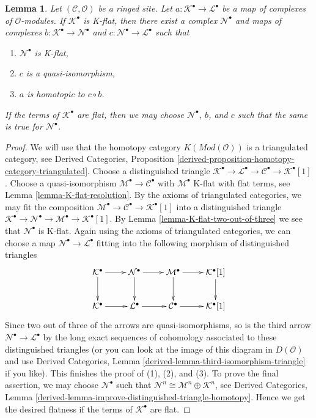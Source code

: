 \documentclass[10pt,a4paper]{amsart}
\theoremstyle{plain}
\newtheorem{lemma}[subsection]{Lemma}
\theoremstyle{definition}
\theoremstyle{remark}
\numberwithin{equation}{subsection}
\begin{document}
\begin{lemma}
\label{lemma-factor-through-K-flat}
Let $(\mathcal{C}, \mathcal{O})$ be a ringed site.
Let $a : \mathcal{K}^\bullet \to \mathcal{L}^\bullet$ be a map of complexes
of $\mathcal{O}$-modules. If $\mathcal{K}^\bullet$ is K-flat, then
there exist a complex $\mathcal{N}^\bullet$ and maps of complexes
$b : \mathcal{K}^\bullet \to \mathcal{N}^\bullet$
and $c : \mathcal{N}^\bullet \to \mathcal{L}^\bullet$ such that
\begin{enumerate}
\item $\mathcal{N}^\bullet$ is K-flat,
\item $c$ is a quasi-isomorphism,
\item $a$ is homotopic to $c \circ b$.
\end{enumerate}
If the terms of $\mathcal{K}^\bullet$ are flat, then we may choose
$\mathcal{N}^\bullet$, $b$, and $c$
such that the same is true for $\mathcal{N}^\bullet$.
\end{lemma}

\begin{proof}
We will use that the homotopy category $K(\textit{Mod}(\mathcal{O}))$
is a triangulated category, see Derived Categories, Proposition
\ref{derived-proposition-homotopy-category-triangulated}.
Choose a distinguished triangle
$\mathcal{K}^\bullet \to \mathcal{L}^\bullet \to
\mathcal{C}^\bullet \to \mathcal{K}^\bullet[1]$.
Choose a quasi-isomorphism $\mathcal{M}^\bullet \to \mathcal{C}^\bullet$ with
$\mathcal{M}^\bullet$ K-flat with flat terms, see
Lemma \ref{lemma-K-flat-resolution}.
By the axioms of triangulated categories,
we may fit the composition
$\mathcal{M}^\bullet \to \mathcal{C}^\bullet \to \mathcal{K}^\bullet[1]$
into a distinguished triangle
$\mathcal{K}^\bullet \to \mathcal{N}^\bullet \to
\mathcal{M}^\bullet \to \mathcal{K}^\bullet[1]$.
By Lemma \ref{lemma-K-flat-two-out-of-three} we see that
$\mathcal{N}^\bullet$ is K-flat.
Again using the axioms of triangulated categories,
we can choose a map $\mathcal{N}^\bullet \to \mathcal{L}^\bullet$ fitting into
the following morphism of distinguished triangles
$$
\xymatrix{
\mathcal{K}^\bullet \ar[r] \ar[d] &
\mathcal{N}^\bullet \ar[r] \ar[d] &
\mathcal{M}^\bullet \ar[r] \ar[d] &
\mathcal{K}^\bullet[1] \ar[d] \\
\mathcal{K}^\bullet \ar[r] &
\mathcal{L}^\bullet \ar[r] &
\mathcal{C}^\bullet \ar[r] &
\mathcal{K}^\bullet[1]
}
$$
Since two out of three of the arrows are quasi-isomorphisms, so is
the third arrow $\mathcal{N}^\bullet \to \mathcal{L}^\bullet$
by the long exact sequences
of cohomology associated to these distinguished triangles
(or you can look at the image of this diagram in $D(\mathcal{O})$ and use
Derived Categories, Lemma \ref{derived-lemma-third-isomorphism-triangle}
if you like). This finishes the proof of (1), (2), and (3).
To prove the final assertion, we may choose $\mathcal{N}^\bullet$ such that
$\mathcal{N}^n \cong \mathcal{M}^n \oplus \mathcal{K}^n$, see
Derived Categories, Lemma
\ref{derived-lemma-improve-distinguished-triangle-homotopy}.
Hence we get the desired flatness
if the terms of $\mathcal{K}^\bullet$ are flat.
\end{proof}
\end{document}
